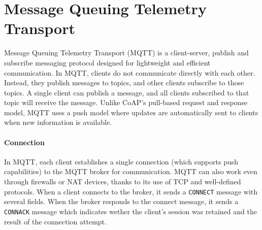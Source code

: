 \section{Message Queuing Telemetry Transport}

Message Queuing Telemetry Transport (MQTT) is a client-server, publish and subscribe messaging protocol designed for lightweight and efficient communication. 
In MQTT, clients do not communicate directly with each other. 
Instead, they publish messages to topics, and other clients subscribe to those topics.
A single client can publish a message, and all clients subscribed to that topic will receive the message.
Unlike CoAP's pull-based request and response model, MQTT uses a push model where updates are automatically sent to clients when new information is available.

\paragraph*{Connection}
In MQTT, each client establishes a single connection (which supports push capabilities) to the MQTT broker for communication. 
MQTT can also work even through firewalls or NAT devices, thanks to its use of TCP and well-defined protocols.
When a client connects to the broker, it sends a \texttt{CONNECT} message with several fields.
When the broker responds to the connect message, it sends a \texttt{CONNACK} message which indicates wether the client's session was retained and the result of the connection attempt. 

